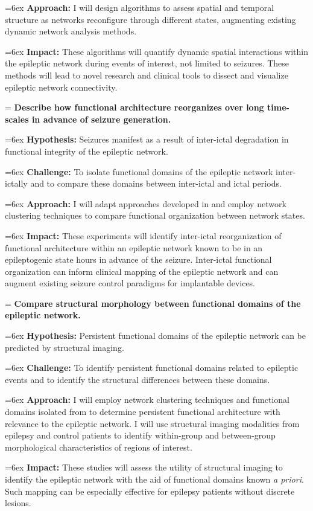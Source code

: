 \hangindent=6ex
\textbf{Approach:} I will design algorithms to assess spatial and temporal structure as networks reconfigure through different states, augmenting existing dynamic network analysis methods.

\hangindent=6ex
\textbf{Impact:} These algorithms will quantify dynamic spatial interactions within the epileptic network during events of interest, not limited to seizures. These methods will lead to novel research and clinical tools to dissect and visualize epileptic network connectivity.


\hangindent=\parindent
{}
\noindent
{} \textbf{Describe how functional architecture reorganizes over long time-scales in advance of seizure generation.}

\hangindent=6ex
\textbf{Hypothesis:} Seizures manifest as a result of inter-ictal degradation in functional integrity of the epileptic network.

\hangindent=6ex
\textbf{Challenge:} To isolate functional domains of the epileptic network inter-ictally and to compare these domains between inter-ictal and ictal periods.

\hangindent=6ex
\textbf{Approach:} I will adapt approaches developed in  and employ network clustering techniques to compare functional organization between network states.

\hangindent=6ex
\textbf{Impact:} These experiments will identify inter-ictal reorganization of functional architecture within an epileptic network known to be in an epileptogenic state hours in advance of the seizure. Inter-ictal functional organization can inform clinical mapping of the epileptic network and can augment existing seizure control paradigms for implantable devices.


\hangindent=\parindent
{}
\noindent
{} \textbf{Compare structural morphology between functional domains of the epileptic network.}

\hangindent=6ex
\textbf{Hypothesis:} Persistent functional domains of the epileptic network can be predicted by structural imaging.

\hangindent=6ex
\textbf{Challenge:} To identify persistent functional domains related to epileptic events and to identify the structural differences between these domains.

\hangindent=6ex
\textbf{Approach:} I will employ network clustering techniques and functional domains isolated from  to determine persistent functional architecture with relevance to the epileptic network. I will use structural imaging modalities from epilepsy and control patients to identify within-group and between-group morphological characteristics of regions of interest.

\hangindent=6ex
\textbf{Impact:} These studies will assess the utility of structural imaging to identify the epileptic network with the aid of functional domains known \textit{a priori}. Such mapping can be especially effective for epilepsy patients without discrete lesions.

